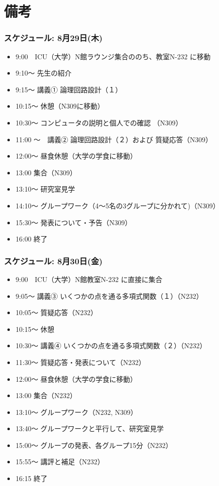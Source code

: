 \documentclass[10pt, dvipdfmx]{beamer}
\begin{document}
\section{備考}
\begin{frame}
\frametitle{スケジュール: 8月29日(木)}
\begin{itemize}
\item 9:00　ICU（大学）N館ラウンジ集合ののち、教室N-232 に移動
\item 9:10〜 先生の紹介
\item 9:15〜 講義① 論理回路設計（１）
\item 10:15〜 休憩（N309に移動）
\item 10:30〜 コンピュータの説明と個人での確認 （N309）
\item 11:00 〜　講義② 論理回路設計（２）および 質疑応答（N309）
\item 12:00〜 昼食休憩（大学の学食に移動） 
\item 13:00 集合（N309） 
\item 13:10〜 研究室見学 
\item 14:10〜 グループワーク（4～5名の3グループに分かれて)（N309） 
\item 15:30〜 発表について・予告（N309） 
\item 16:00 終了 
\end{itemize}
\end{frame}
\begin{frame}
\frametitle{スケジュール: 8月30日(金)}
\begin{itemize}
\item 9:00　ICU（大学）N館教室N-232 に直接に集合 
\item 9:05〜 講義③ いくつかの点を通る多項式関数（１）（N232） 
\item 10:05〜 質疑応答（N232） 
\item 10:15〜 休憩 
\item 10:30〜 講義④ いくつかの点を通る多項式関数（２）（N232） 
\item 11:30〜 質疑応答・発表について（N232） 
\item 12:00〜 昼食休憩（大学の学食に移動） 
\item 13:00 集合（N232） 
\item 13:10〜 グループワーク（N232, N309） 
\item 13:40〜 グループワークと平行して、研究室見学　 
\item 15:00〜 グループの発表、各グループ15分（N232） 
\item 15:55〜 講評と補足（N232） 
\item 16:15 終了 
\end{itemize}
\end{frame}
\end{document}
